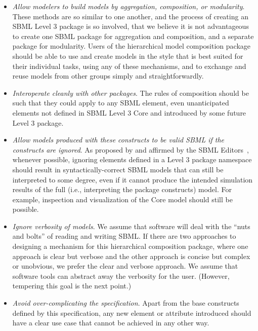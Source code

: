 \begin{itemize}

\item \emph{Allow modelers to build models by aggregation, composition,
    or modularity}.  These methods are so similar to one another, and the
  process of creating an SBML Level 3 package is so involved, that we
  believe it is not advantageous to create one SBML package for
  aggregation and composition, and a separate package for modularity.
  Users of the hierarchical model composition package should be able to
  use and create models in the style that is best suited for their
  individual tasks, using any of these mechanisms, and to exchange and
  reuse models from other groups simply and straightforwardly.

\item \emph{Interoperate cleanly with other packages}. The rules of
  composition should be such that they could apply to any SBML element,
  even unanticipated elements not defined in SBML Level 3 Core and
  introduced by some future Level 3 package.

\item \emph{Allow models produced with these constructs to be valid SBML
    if the constructs are ignored}.  As proposed by \citet*{lenov:2003}
  and affirmed by the SBML Editors~\citep{editors:2010}, whenever
  possible, ignoring elements defined in a Level 3 package namespace
  should result in syntactically-correct SBML models that can still be
  interpreted to some degree, even if it cannot produce the intended
  simulation results of the full (i.e., interpreting the package
  constructs) model.  For example, inspection and visualization of the
  Core model should still be possible.

\item \emph{Ignore verbosity of models}. We assume that software will
  deal with the ``nuts and bolts'' of reading and writing SBML.  If
  there are two approaches to designing a mechanism for this
  hierarchical composition package, where one approach is clear but
  verbose and the other approach is concise but complex or unobvious, we
  prefer the clear and verbose approach.  We assume that software tools
  can abstract away the verbosity for the user.  (However, tempering
  this goal is the next point.)

\item \emph{Avoid over-complicating the specification}. Apart from the
  base constructs defined by this specification, any new element or
  attribute introduced should have a clear use case that cannot be
  achieved in any other way.


\end{itemize}

